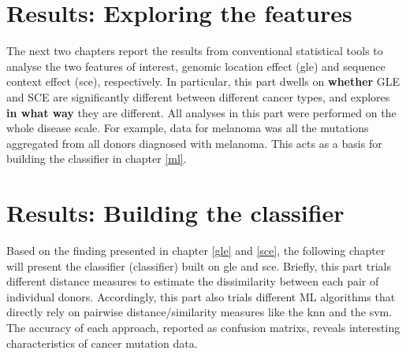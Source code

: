 \documentclass[12pt,a4paper, twoside,]{report}
\begin{document}






\newpage

{
  \hypersetup{linkcolor=CadetBlue}
  \tableofcontents
}
\newpage
\label{glossary}
\printglossary
\newpage



\newpage

\part{Results: Exploring the features}{
    The next two chapters report the results from conventional statistical tools to analyse the two features of interest, genomic location effect (\gls{gle}) and sequence context effect (\gls{sce}), respectively. In particular, this part dwells on \textbf{whether} GLE and SCE are significantly different between different cancer types, and explores \textbf{in what way} they are different. All analyses in this part were performed on the whole disease scale. For example, data for melanoma was all the mutations aggregated from all donors diagnosed with melanoma. This acts as a basis for building the \gls{classifier} in chapter \ref{ml}.
}




\part{Results: Building the classifier}{
    Based on the finding presented in chapter \ref{gle} and \ref{sce}, the following chapter will present the classifier (\gls{classifier}) built on \gls{gle} and \gls{sce}. Briefly, this part trials different distance measures to estimate the dissimilarity between each pair of individual donors. Accordingly, this part also trials different ML algorithms that directly rely on pairwise distance/similarity measures like the \gls{knn} and the \gls{svm}. The accuracy of each approach, reported as \glspl{confusion matrix}, reveals interesting characteristics of cancer mutation data.  
}








\end{document}
